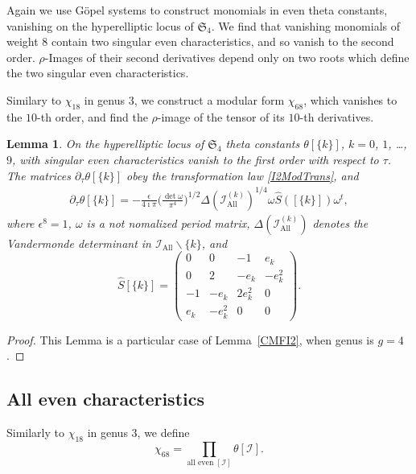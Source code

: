 \documentclass[twoside]{amsart}
\newcommand{\I}{\mathcal{I}}
\newtheorem{lemma}{Lemma}[section]
\theoremstyle{definition}
\theoremstyle{plain}
\begin{document}
Again we use G\"{o}pel systems to construct monomials in even theta constants, vanishing 
on the hyperelliptic locus of $\mathfrak{S}_4$. 
We find that vanishing monomials of weight $8$ contain two singular even characteristics,
and so vanish to the second order.  $\rho$-Images of
their second derivatives depend only on two roots which define the two singular even characteristics.

Similary to $\chi_{18}$ in genus $3$, we construct a modular form
 $\chi_{68}$, which vanishes to the $10$-th order, and find the $\rho$-image 
 of the tensor of its $10$-th derivatives.

\begin{lemma}\label{CMFI2G4}
On the hyperelliptic locus of $\mathfrak{S}_4$ 
theta constants $\theta[\{k\}]$, $k=0$, $1$, \ldots, $9$,  
with singular even characteristics vanish 
to the first order with respect to $\tau$. The matrices  
$\partial_\tau \theta[\{k\}]$ obey the transformation law \eqref{I2ModTrans}, and
\begin{gather}\label{Chi5s2G4}
\partial_\tau \theta[\{k\}]
 = - \frac{\epsilon}{4\imath \pi}  \Big(\frac{\det \omega}{\pi^4}\Big)^{1/2} \Delta(\I_{\text{All}}^{(k)})^{1/4}  
 \omega \hat{S}([\{k\}]) \omega^t,
\end{gather}
where $\epsilon^8=1$, $\omega$ is a not nomalized period matrix, $\Delta(\I_{\text{All}}^{(k)})$ denotes 
the Vandermonde determinant in $\I_{\text{All}} \backslash \{k\}$, and
$$\hat{S}[\{k\}] =  \begin{pmatrix} 0 & 0 & -1 & e_k \\ 0 & 2 & -e_k & -e_k^2 \\ 
 -1 & -e_k & 2e_k^2 & 0 \\ e_k & - e_k^2 & 0 & 0 \end{pmatrix}. $$
\end{lemma}
\begin{proof}
This Lemma is a particular case of Lemma~\ref{CMFI2}, when genus is $g=4$.
\end{proof}


\subsection{All even characteristics}
Similarly to $\chi_{18}$ in genus $3$, we define
\begin{equation}\label{Chi68Gen}
\chi_{68} = \prod_{\text{all even }[\I]} \theta[\I].
\end{equation}
\end{document}
